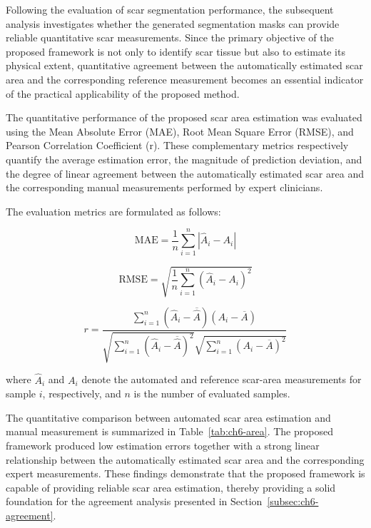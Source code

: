 Following the evaluation of scar segmentation performance, the subsequent analysis investigates whether the generated segmentation masks can provide reliable quantitative scar measurements. Since the primary objective of the proposed framework is not only to identify scar tissue but also to estimate its physical extent, quantitative agreement between the automatically estimated scar area and the corresponding reference measurement becomes an essential indicator of the practical applicability of the proposed method.

The quantitative performance of the proposed scar area estimation was evaluated using the Mean Absolute Error (MAE), Root Mean Square Error (RMSE), and Pearson Correlation Coefficient (r). These complementary metrics respectively quantify the average estimation error, the magnitude of prediction deviation, and the degree of linear agreement between the automatically estimated scar area and the corresponding manual measurements performed by expert clinicians.

The evaluation metrics are formulated as follows:

\begin{equation}
	\mathrm{MAE}=\frac{1}{n}\sum_{i=1}^{n}\left|\hat{A}_{i}-A_{i}\right|
	\label{eq:ch6-mae}
\end{equation}

\begin{equation}
	\mathrm{RMSE}=\sqrt{\frac{1}{n}\sum_{i=1}^{n}\left(\hat{A}_{i}-A_{i}\right)^2}
	\label{eq:ch6-rmse}
\end{equation}

\begin{equation}
	r=\frac{\sum_{i=1}^{n}(\hat{A}_{i}-\overline{\hat{A}})(A_{i}-\overline{A})}{\sqrt{\sum_{i=1}^{n}(\hat{A}_{i}-\overline{\hat{A}})^2}\sqrt{\sum_{i=1}^{n}(A_{i}-\overline{A})^2}}
	\label{eq:ch6-pcc}
\end{equation}

where $\hat{A}_{i}$ and $A_i$ denote the automated and reference scar-area measurements for sample $i$, respectively, and $n$ is the number of evaluated samples.

The quantitative comparison between automated scar area estimation and manual measurement is summarized in Table~\ref{tab:ch6-area}. The proposed framework produced low estimation errors together with a strong linear relationship between the automatically estimated scar area and the corresponding expert measurements. These findings demonstrate that the proposed framework is capable of providing reliable scar area estimation, thereby providing a solid foundation for the agreement analysis presented in Section~\ref{subsec:ch6-agreement}.

